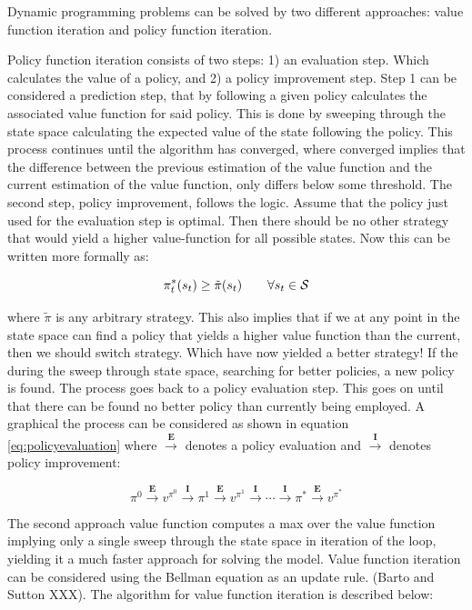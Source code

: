 Dynamic programming problems can be solved by two different approaches: value function iteration and policy function iteration.

Policy function iteration consists of two steps: 1) an evaluation step. Which calculates the value of a policy, and 2) a policy improvement step.
Step 1 can be considered a prediction step, that by following a given policy calculates the associated value function for said policy. This is done by sweeping through the state space calculating the expected value of the state following the policy. This process continues until the algorithm has converged, where converged implies that the difference between the previous estimation of the value function and the current estimation of the value function, only differs below some threshold. The second step, policy improvement, follows the logic. Assume that the policy just used for the evaluation step is optimal. Then there should be no other strategy that would yield a higher value-function for all possible states. Now this can be written more formally as:

\begin{equation}
    \pi^*_t (s_t) \geq \tilde{\pi}(s_t)\qquad \forall s_t \in \mathcal{S}
\end{equation}

where $\tilde{\pi}$ is any arbitrary strategy. This also implies that if we at any point in the state space can find a policy that yields a higher value function than the current, then we should switch strategy. Which have now yielded a better strategy! If the during the sweep through state space, searching for better policies, a new policy is found. The process goes back to a policy evaluation step. This goes on until that there can be found no better policy than currently being employed. A graphical the process can be considered as shown in equation \eqref{eq:policyevaluation} where $\overset{\textbf{E}}{\longrightarrow}$ denotes a policy evaluation and $\overset{\textbf{I}}{\longrightarrow}$ denotes policy improvement:

\begin{equation}
    \label{eq:policyevaluation}
    \pi^0 \overset{\textbf{E}}{\longrightarrow}
    v^{\pi^0} \overset{\textbf{I}}{\longrightarrow} \pi^1 \overset{\textbf{E}}{\longrightarrow} v^{\pi^1} \overset{\textbf{I}}{\longrightarrow} \cdots \overset{\textbf{I}}{\longrightarrow} \pi^* \overset{\textbf{E}}{\longrightarrow} v^{\pi^*}
\end{equation}

The second approach value function computes a max over the value function implying only a single sweep through the state space in iteration of the loop, yielding it a much faster approach for solving the model. Value function iteration can be considered using the Bellman equation as an update rule. (Barto and Sutton XXX). The algorithm for value function iteration is described below:

